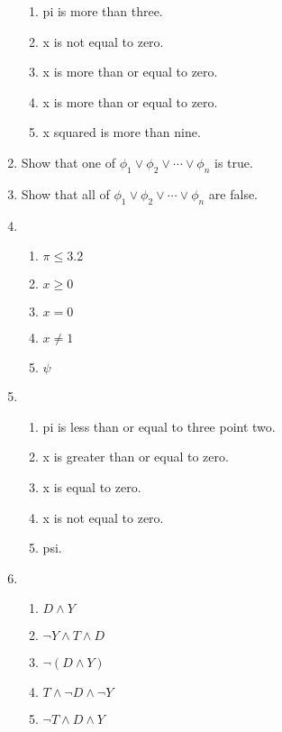 \documentclass[11pt]{article}
\begin{document}
\begin{enumerate}
        \begin{enumerate}[label=(\alph*)]
            \item pi is more than three.
            \item x is not equal to zero.
            \item x is more than or equal to zero.
            \item x is more than or equal to zero.
            \item x squared is more than  nine.
        \end{enumerate}
    \item Show that one of $\phi_1 \vee \phi_2 \vee \cdots \vee \phi_n$ is true.
    \item Show that all of $\phi_1 \vee \phi_2 \vee \cdots \vee \phi_n$ are false.
    \item
        \begin{enumerate}[label=(\alph*)]
            \item $\pi \leq 3.2$
            \item $x \geq 0$
            \item $x = 0$
            \item $x \neq 1$
            \item $\psi$
        \end{enumerate}
    \item
        \begin{enumerate}[label=(\alph*)]
            \item pi is less than or equal to three point two.
            \item x is greater than or equal to zero.
            \item x is equal to zero.
            \item x is not equal to zero.
            \item psi.
        \end{enumerate}
    \item
        \begin{enumerate}[label=(\alph*)]
            \item $D \land Y$
            \item $\neg Y \land T \land D$
            \item $\neg (D \land Y)$
            \item $T \land \neg D \land \neg Y$
            \item $\neg T \land D \land Y$
        \end{enumerate}
\end{enumerate}
\end{document}
